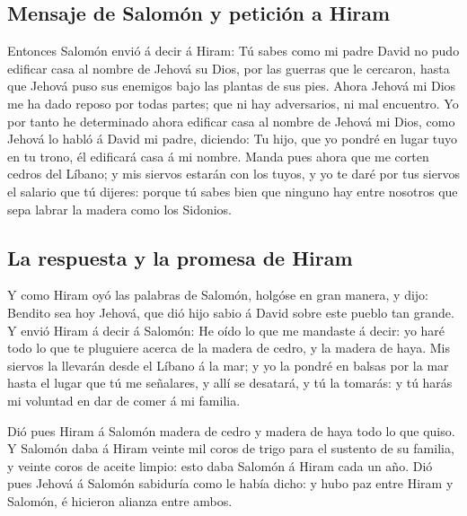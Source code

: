 \hypertarget{mensaje-de-salomuxf3n-y-peticiuxf3n-a-hiram}{%
\subsection{Mensaje de Salomón y petición a
Hiram}\label{mensaje-de-salomuxf3n-y-peticiuxf3n-a-hiram}}

 Entonces Salomón envió á decir á Hiram:  Tú
sabes como mi padre David no pudo edificar casa al nombre de Jehová su
Dios, por las guerras que le cercaron, hasta que Jehová puso sus
enemigos bajo las plantas de sus pies.  Ahora Jehová mi Dios
me ha dado reposo por todas partes; que ni hay adversarios, ni mal
encuentro.  Yo por tanto he determinado ahora edificar casa
al nombre de Jehová mi Dios, como Jehová lo habló á David mi padre,
diciendo: Tu hijo, que yo pondré en lugar tuyo en tu trono, él edificará
casa á mi nombre.  Manda pues ahora que me corten cedros del
Líbano; y mis siervos estarán con los tuyos, y yo te daré por tus
siervos el salario que tú dijeres: porque tú sabes bien que ninguno hay
entre nosotros que sepa labrar la madera como los Sidonios.

\hypertarget{la-respuesta-y-la-promesa-de-hiram}{%
\subsection{La respuesta y la promesa de
Hiram}\label{la-respuesta-y-la-promesa-de-hiram}}

 Y como Hiram oyó las palabras de Salomón, holgóse en gran
manera, y dijo: Bendito sea hoy Jehová, que dió hijo sabio á David sobre
este pueblo tan grande.  Y envió Hiram á decir á Salomón: He
oído lo que me mandaste á decir: yo haré todo lo que te pluguiere acerca
de la madera de cedro, y la madera de haya.  Mis siervos la
llevarán desde el Líbano á la mar; y yo la pondré en balsas por la mar
hasta el lugar que tú me señalares, y allí se desatará, y tú la tomarás:
y tú harás mi voluntad en dar de comer á mi familia.

 Dió pues Hiram á Salomón madera de cedro y madera de haya
todo lo que quiso.  Y Salomón daba á Hiram veinte mil coros
de trigo para el sustento de su familia, y veinte coros de aceite
limpio: esto daba Salomón á Hiram cada un año.  Dió pues
Jehová á Salomón sabiduría como le había dicho: y hubo paz entre Hiram y
Salomón, é hicieron alianza entre ambos.

